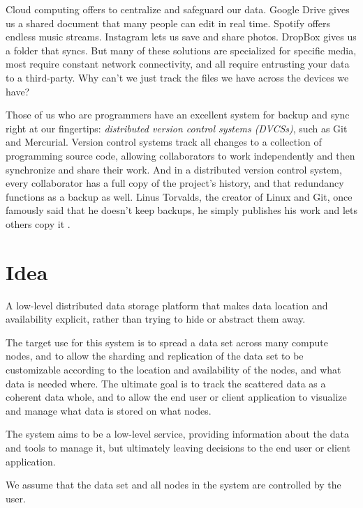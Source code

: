 \documentclass[12pt,a4paper,two-side]{book}
\newcommand{\newterm}{\textit}
\begin{document}
Cloud computing offers to centralize and safeguard our data. Google Drive gives
us a shared document that many people can edit in real time. Spotify offers
endless music streams. Instagram lets us save and share photos. DropBox gives us
a folder that syncs. But many of these solutions are specialized for specific
media, most require constant network connectivity, and all require entrusting
your data to a third-party. Why can't we just track the files we have across the
devices we have?

Those of us who are programmers have an excellent system for backup and sync
right at our fingertips: \newterm{distributed version control systems (DVCSs)},
such as Git and Mercurial. Version control systems track all changes to a
collection of programming source code, allowing collaborators to work
independently and then synchronize and share their work. And in a distributed
version control system, every collaborator has a full copy of the project's
history, and that redundancy functions as a backup as well. Linus Torvalds, the
creator of Linux and Git, once famously said that he doesn't keep backups, he
simply publishes his work and lets others copy it \cite{linus_no_backups}.










\chapter{Idea}

A low-level distributed data storage platform that makes data location and
availability explicit, rather than trying to hide or abstract them away.

The target use for this system is to spread a data set across many compute
nodes, and to allow the sharding and replication of the data set to be
customizable according to the location and availability of the nodes, and what
data is needed where. The ultimate goal is to track the scattered data as a
coherent data whole, and to allow the end user or client application to
visualize and manage what data is stored on what nodes.

The system aims to be a low-level service, providing information about the data
and tools to manage it, but ultimately leaving decisions to the end user or
client application.

We assume that the data set and all nodes in the system are controlled by the
user.
\end{document}
